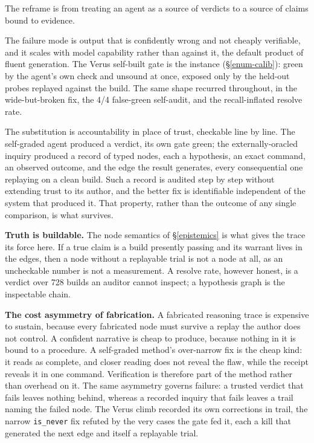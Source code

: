 \documentclass[
  10pt,
]{article}
\begin{document}
The reframe is from treating an agent as a source of verdicts to a
source of claims bound to evidence.

The failure mode is output that is confidently wrong and not cheaply
verifiable, and it scales with model capability rather than against it,
the default product of fluent generation. The Verus self-built gate is
the instance (\S\ref{enum-calib}): green by the agent's own check and
unsound at once, exposed only by the held-out probes replayed against
the build. The same shape recurred throughout, in the wide-but-broken
fix, the 4/4 false-green self-audit, and the recall-inflated resolve
rate.

The substitution is accountability in place of trust, checkable line by
line. The self-graded agent produced a verdict, its own gate green; the
externally-oracled inquiry produced a record of typed nodes, each a
hypothesis, an exact command, an observed outcome, and the edge the
result generates, every consequential one replaying on a clean build.
Such a record is audited step by step without extending trust to its
author, and the better fix is identifiable independent of the system
that produced it. That property, rather than the outcome of any single
comparison, is what survives.

\textbf{Truth is buildable.} The node semantics of \S\ref{epistemics} is
what gives the trace its force here. If a true claim is a build
presently passing and its warrant lives in the edges, then a node
without a replayable trial is not a node at all, as an uncheckable
number is not a measurement. A resolve rate, however honest, is a
verdict over 728 builds an auditor cannot inspect; a hypothesis graph is
the inspectable chain.

\textbf{The cost asymmetry of fabrication.} A fabricated reasoning trace
is expensive to sustain, because every fabricated node must survive a
replay the author does not control. A confident narrative is cheap to
produce, because nothing in it is bound to a procedure. A self-graded
method's over-narrow fix is the cheap kind: it reads as complete, and
closer reading does not reveal the flaw, while the receipt reveals it in
one command. Verification is therefore part of the method rather than
overhead on it. The same asymmetry governs failure: a trusted verdict
that fails leaves nothing behind, whereas a recorded inquiry that fails
leaves a trail naming the failed node. The Verus climb recorded its own
corrections in trail, the narrow \texttt{is\_never} fix refuted by the
very cases the gate fed it, each a kill that generated the next edge and
itself a replayable trial.
\end{document}
